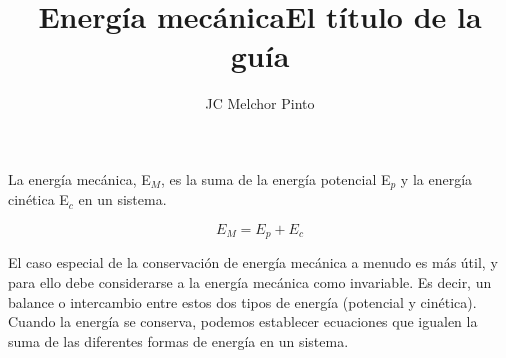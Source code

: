 \documentclass[12pt,addpoints,answers]{guia}
\title{Energía mecánica}
\title{El título de la guía}
\author{JC Melchor Pinto}
\begin{document}
\pagestyle{headandfoot}

\INFO
\begin{opening}
    {La energía mecánica, E$_M$, es la suma de la energía potencial E$_p$ y
        la energía cinética E$_c$ en un sistema.

        \[ E_M=E_p+E_c\]

        El caso especial de la conservación de energía mecánica a menudo es más útil, y para ello debe considerarse a la energía mec\'anica como invariable. Es decir, un balance o intercambio entre estos dos tipos de energía (potencial y cinética). Cuando la energía se conserva, podemos establecer ecuaciones que igualen la suma de las diferentes formas de energía en un sistema.
    }
\end{opening}
\begin{questions}
    
    \newpage
    
    \newpage
    
\end{questions}

\end{document}
